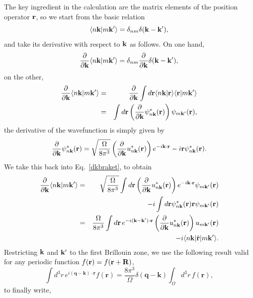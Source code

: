 \documentclass[floatfix,prb,aps,superscriptaddress,11pt,preprint]{revtex4}
\begin{document}
The key ingredient in the calculation are the matrix elements of the
position operator $\mathbf{r}$, 
so we start from the basic relation
\begin{equation}\label{nbraket}
\langle {n\mathbf{k}} | {m\mathbf{k}'} \rangle
=\delta_{nm}\delta(\mathbf{k}-\mathbf{k}'),
\end{equation}
and take its derivative with respect to $\mathbf{k}$ as follows.
On one hand,
\begin{equation}\label{ddk1}
\frac{\partial}{\partial\mathbf{k}}
\langle {n\mathbf{k}} | {m\mathbf{k}'} \rangle=\delta_{nm}\frac{\partial}{\partial\mathbf{k}}\delta(\mathbf{k}-\mathbf{k}'),
\end{equation}
on the other,
\begin{eqnarray}\label{dkbraket}
\frac{\partial}{\partial\mathbf{k}}
\langle {n\mathbf{k}} | {m\mathbf{k}'} \rangle
&=&
\frac{\partial}{\partial\mathbf{k}}
\int d\mathbf{r}
 \langle {n\mathbf{k}} | {\mathbf{r}} \rangle 
\langle {\mathbf{r}} | {m\mathbf{k}'} \rangle
\nonumber \\
&=&
\int d\mathbf{r}
\left(
\frac{\partial}{\partial\mathbf{k}}
\psi^*_{n\mathbf{k}}(\mathbf{r})
\right)
\psi_{m\mathbf{k}'}(\mathbf{r}),
\end{eqnarray}
the derivative of the wavefunction is simply given by
\begin{equation}\label{dpsi}
\frac{\partial}{\partial\mathbf{k}}
 \psi^*_{n\mathbf{k}}(\mathbf{r})
=
\sqrt{\frac{\Omega}{8\pi^3}}
\left(\frac{\partial}{\partial\mathbf{k}} u^*_{n\mathbf{k}}(\mathbf{r})\right)e^{-i\mathbf{k}\cdot\mathbf{r}}
-i\mathbf{r}\psi^*_{n\mathbf{k}}(\mathbf{r}).
\end{equation}
We take this back into Eq.~\eqref{dkbraket}, to obtain
\begin{eqnarray}\label{dkbraket2}
\frac{\partial}{\partial\mathbf{k}}
\langle {n\mathbf{k}} | {m\mathbf{k}'} \rangle
&=&
\sqrt{\frac{\Omega}{8\pi^3}}
\int d\mathbf{r}
\left(\frac{\partial}{\partial\mathbf{k}} u^*_{n\mathbf{k}}(\mathbf{r})\right)e^{-i\mathbf{k}\cdot\mathbf{r}}
 \psi_{m\mathbf{k}'}(\mathbf{r})
\nonumber \\
&&-i
\int d\mathbf{r} 
\psi^*_{n\mathbf{k}}(\mathbf{r})
\mathbf{r}
 \psi_{m\mathbf{k}'}(\mathbf{r})
\nonumber \\
&=&
\frac{\Omega}{8\pi^3}
\int d\mathbf{r}\,
e^{-i(\mathbf{k}-\mathbf{k}')\cdot\mathbf{r}}
\left(\frac{\partial}{\partial\mathbf{k}} u^*_{n\mathbf{k}}(\mathbf{r})\right)
u_{m\mathbf{k}'}(\mathbf{r})
\nonumber \\
&&-i
\langle n\mathbf{k} |\hat{\mathbf{r}}| m\mathbf{k}' \rangle.
\end{eqnarray}
Restricting $\mathbf{k}$ and $\mathbf{k}'$ to the first Brillouin zone,
we use the following result valid for any periodic
function $f(\mathbf{r})=f(\mathbf{r}+\mathbf{R})$,
\begin{equation}\label{periodic}
\int d^{3}r\, e^{i(\mathbf{q}-\mathbf{k})\cdot\mathbf{r}}f(\mathbf{r})=\frac{8\pi^{3}}{\Omega}\delta(\mathbf{q}-\mathbf{k})\int_{\Omega}d^{3}r\, f(\mathbf{r})
,
\end{equation}
to
finally write,\cite{blount}
\end{document}
